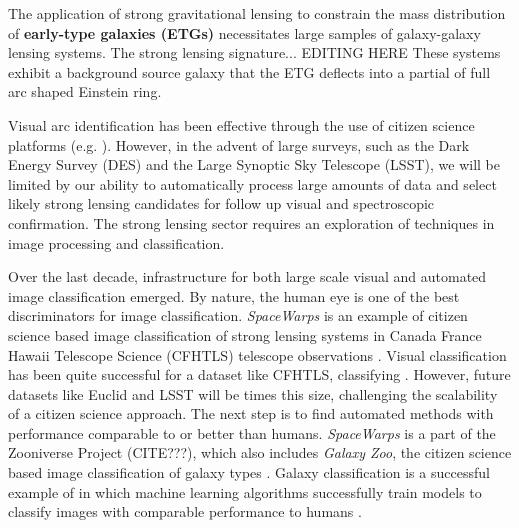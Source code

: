 \documentclass{emulateapj}
\newcommand{\todo}[1]{{\bf\color{blue} #1}}
\begin{document}
The application of strong gravitational lensing to constrain the mass
distribution of \todo{early-type galaxies (ETGs)} necessitates large
samples of galaxy-galaxy lensing systems.  The strong lensing
signature... EDITING HERE These systems exhibit a background source
galaxy that the ETG deflects into a partial of full arc shaped
Einstein ring.

Visual arc identification has been effective through the use of
citizen science platforms (e.g. \citet{marshall_etal16,more_etal16}).
However, in the advent of large surveys, such as the Dark Energy
Survey (DES) and the Large Synoptic Sky Telescope (LSST), we will be
limited by our ability to automatically process large amounts of data
and select likely strong lensing candidates for follow up visual and
spectroscopic confirmation.  The strong lensing sector requires an
exploration of techniques in image processing and classification.

Over the last decade, infrastructure for both large scale visual and
automated image classification emerged. By nature, the human eye is
one of the best discriminators for image classification.  {\em
  SpaceWarps} is an example of citizen science based image
classification of strong lensing systems in Canada France Hawaii
Telescope Science (CFHTLS) telescope observations
\citep{marshall_etal16,more_etal16}.  Visual classification has been
quite successful for a dataset like CFHTLS, classifying .  However, future datasets like Euclid and LSST will be
 times this size, challenging the scalability of a citizen
science approach.  The next step is to find automated methods with
performance comparable to or better than humans. {\em SpaceWarps} is a
part of the Zooniverse Project (CITE???), which also includes {\em
  Galaxy Zoo}, the citizen science based image classification of
galaxy types \citep{lintott_etal08}.  Galaxy classification is a
successful example of in which machine learning algorithms
successfully train models to classify images with comparable
performance to humans \citep{dieleman_etal15}.
\end{document}
